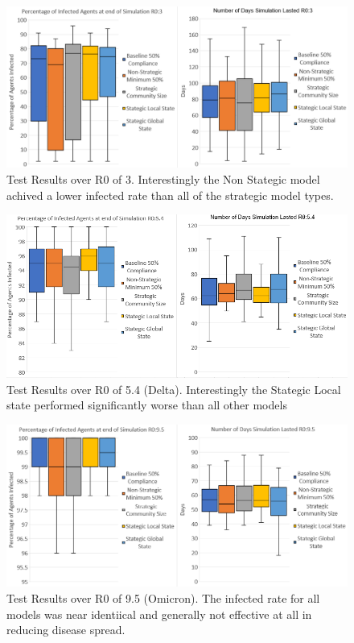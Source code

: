 \documentclass{article}
\begin{document}
\begin{figure}[h!]
\centering
\includegraphics[width=\textwidth]{4}
\caption{Test Results over R0 of 3. Interestingly the Non Stategic model achived a lower infected rate than all of the strategic model types.}
\end{figure}

\newpage

\begin{figure}[h!]
\centering
\includegraphics[width=\textwidth]{3}
\caption{Test Results over R0 of 5.4 (Delta). Interestingly the Stategic Local state performed significantly worse than all other models}
\end{figure}

\begin{figure}[h!]
\centering
\includegraphics[width=\textwidth]{2}
\caption{Test Results over R0 of 9.5 (Omicron). The infected rate for all models was near identiical and generally not effective at all in reducing disease spread. }
\end{figure}
\newpage
\end{document}
